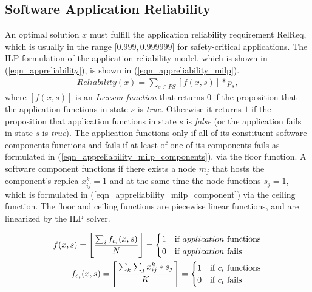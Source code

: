 \subsection{Software Application Reliability}
An optimal solution $x$ must fulfill the application reliability requirement RelReq, which is usually in the range [$0.999, 0.999999$] for safety-critical applications. The ILP formulation of the application reliability model, which is shown in (\ref{eqn_appreliability}), is shown in (\ref{eqn_appreliability_milp}).
\begin{align}
\label{eqn_appreliability_milp}
Reliability(x)=\sum_{s\in PS}[f(x,s)]*p_s,
\end{align}
where $[f(x,s)]$ is an \textit{Iverson function } that returns $0$ if the proposition that the application functions in state $s$ is \textit{true}. Otherwise it returns $1$ if the proposition that application functions in state $s$ is \textit{false} (or the application fails in state $s$ is \textit{true}). The application functions only if all of its constituent software components functions and fails if at least of one of its components fails as formulated in (\ref{eqn_appreliability_milp_components}), via the floor function. A software component functions if there exists a node $m_j$ that hosts the component's replica $x_{ij}^k=1$ and at the same time the node functions $s_{j}=1$, which is formulated in (\ref{eqn_appreliability_milp_component}) via the ceiling function. The floor and ceiling functions are piecewise linear functions, and are linearized by the ILP solver.

\begin{align}
f(x,s) = \floor[\Bigg]{\frac{\sum_if_{c_i}(x,s)}{N}}=
\begin{cases}
1 & \mbox{if } application \mbox{ functions}\\
0 & \mbox{if } application \mbox{ fails}
\end{cases}\label{eqn_appreliability_milp_components}\\
f_{c_i}(x,s) = \ceil[\Bigg]{\frac{\sum_k\sum_j x^{k}_{ij}*s_j}{K}}=
\begin{cases}
1 & \mbox{if } c_i \mbox{ functions}\\
0 & \mbox{if } c_i \mbox{ fails}
\end{cases}\label{eqn_appreliability_milp_component}
\end{align}


